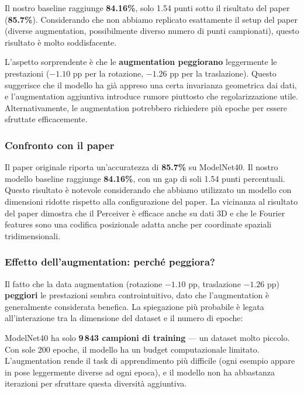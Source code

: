 \documentclass[12pt,a4paper]{article}
\begin{document}
\begin{examplebox}
Il nostro baseline raggiunge \textbf{84.16\%}, solo 1.54 punti sotto il risultato del paper (\textbf{85.7\%}). Considerando che non abbiamo replicato esattamente il setup del paper (diverse augmentation, possibilmente diverso numero di punti campionati), questo risultato \`e molto soddisfacente.

L'aspetto sorprendente \`e che le \textbf{augmentation peggiorano} leggermente le prestazioni ($-1.10$ pp per la rotazione, $-1.26$ pp per la traslazione). Questo suggerisce che il modello ha gi\`a appreso una certa invarianza geometrica dai dati, e l'augmentation aggiuntiva introduce rumore piuttosto che regolarizzazione utile. Alternativamente, le augmentation potrebbero richiedere pi\`u epoche per essere sfruttate efficacemente.
\end{examplebox}

\subsubsection{Confronto con il paper}

Il paper originale riporta un'accuratezza di \textbf{85.7\%} su ModelNet40. Il nostro modello baseline raggiunge \textbf{84.16\%}, con un gap di soli 1.54 punti percentuali. Questo risultato \`e notevole considerando che abbiamo utilizzato un modello con dimensioni ridotte rispetto alla configurazione del paper. La vicinanza al risultato del paper dimostra che il Perceiver \`e efficace anche su dati 3D e che le Fourier features sono una codifica posizionale adatta anche per coordinate spaziali tridimensionali.

\subsubsection{Effetto dell'augmentation: perch\'e peggiora?}

Il fatto che la data augmentation (rotazione $-1.10$ pp, traslazione $-1.26$ pp) \textbf{peggiori} le prestazioni sembra controintuitivo, dato che l'augmentation \`e generalmente considerata benefica. La spiegazione pi\`u probabile \`e legata all'interazione tra la dimensione del dataset e il numero di epoche:

ModelNet40 ha solo \textbf{9\,843 campioni di training} --- un dataset molto piccolo. Con sole 200 epoche, il modello ha un budget computazionale limitato. L'augmentation rende il task di apprendimento pi\`u difficile (ogni esempio appare in pose leggermente diverse ad ogni epoca), e il modello non ha abbastanza iterazioni per sfruttare questa diversit\`a aggiuntiva.
\end{document}
